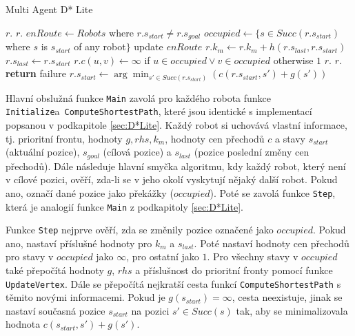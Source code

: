\begin{algorithm}[H]
	\caption{Multi Agent D* Lite}
	\label{alg:LRD*Lite}
	\begin{algorithmic}[1]
		\State $r.$
		\State $r.$
		\EndFor
		\State $enRoute\gets Robots$ where $r.s_{start}\neq r.s_{goal}$
		\State $occupied\gets \{s\in Succ(r.s_{start})$ where $s$ is $s_{start}$ of any robot$\}$
		\State {}
		\State update $enRoute$
		\EndFor
		\EndWhile
		\EndFunction
		\Statex
		\State $r.k_m\gets r.k_m+h(r.s_{last},r.s_{start})$
		\State $r.s_{last}\gets r.s_{start}$
		\State $r.c(u,v)\gets \infty$ if $u\in occupied\vee v\in occupied$ otherwise $1$
		\State $r.$
		\EndFor
		\State $r.$
		\EndIf
		\State \textbf{return} failure
		\EndIf
		\State $r.s_{start}\gets \arg\min_{s'\in Succ(r.s_{start})}(c(r.s_{start},s')+g(s'))$
		\EndFunction
	\end{algorithmic}
\end{algorithm}

Hlavní obslužná funkce \texttt{Main} zavolá pro každého robota funkce \texttt{Initialize}\linebreak a~\texttt{ComputeShortestPath}, které jsou identické s implementací popsanou v podkapitole \ref{sec:D*Lite}. Každý robot si uchovává vlastní informace, tj. prioritní frontu, hodnoty $g,rhs,k_m$, hodnoty cen přechodů $c$ a stavy $s_{start}$ (aktuální pozice), $s_{goal}$ (cílová pozice) a $s_{last}$ (pozice poslední změny cen přechodů). Dále následuje hlavní smyčka algoritmu, kdy každý robot, který není v cílové pozici, ověří, zda-li se v jeho okolí vyskytují nějaký další robot. Pokud ano, označí dané pozice jako překážky ($occupied$). Poté se zavolá funkce \texttt{Step}, která je analogií funkce \texttt{Main} z podkapitoly \ref{sec:D*Lite}. 

Funkce \texttt{Step} nejprve ověří, zda se změnily pozice označené jako $occupied$. Pokud ano, nastaví příslušné hodnoty pro $k_m$ a $s_{last}$. Poté nastaví hodnoty cen přechodů pro stavy v $occupied$ jako $\infty$, pro ostatní jako $1$. Pro všechny stavy v $occupied$ také přepočítá hodnoty $g$, $rhs$ a příslušnost do prioritní fronty pomocí funkce \texttt{UpdateVertex}. Dále se přepočítá nejkratší cesta funkcí \texttt{ComputeShortestPath} s těmito novými informacemi. Pokud je $g(s_{start})=\infty$, cesta neexistuje, jinak se nastaví současná pozice $s_{start}$ na pozici $s'\in Succ(s)$ tak, aby se minimalizovala hodnota $c(s_{start},s')+g(s')$.


